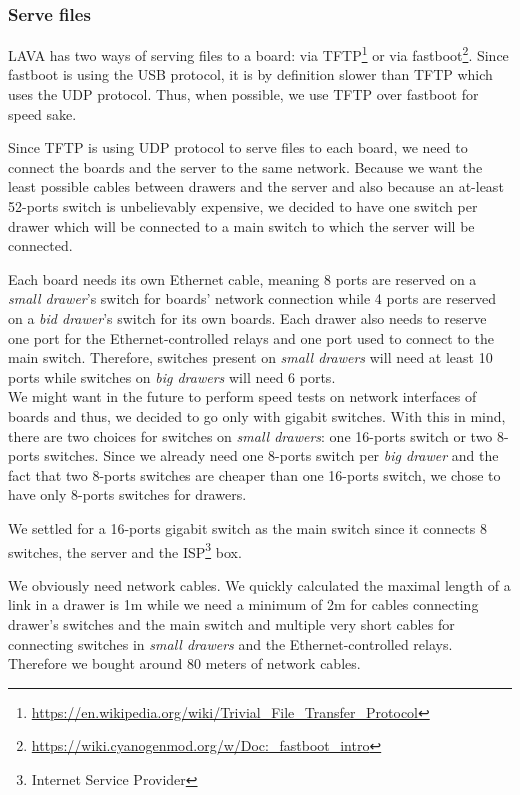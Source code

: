 \subsubsection{Serve files}

LAVA has two ways of serving files to a board: via TFTP\footnote{\url{https://en.wikipedia.org/wiki/Trivial\_File\_Transfer\_Protocol}} or via fastboot\footnote{\url{https://wiki.cyanogenmod.org/w/Doc:\_fastboot\_intro}}. Since fastboot is using the USB protocol, it is by definition slower than TFTP which uses the UDP protocol. Thus, when possible, we use TFTP over fastboot for speed sake.

Since TFTP is using UDP protocol to serve files to each board, we need to connect the boards and the server to the same network. Because we want the least possible cables between drawers and the server and also because an at-least 52-ports switch is unbelievably expensive, we decided to have one switch per drawer which will be connected to a main switch to which the server will be connected.

Each board needs its own Ethernet cable, meaning 8 ports are reserved on a \textit{small drawer}'s switch for boards' network connection while 4 ports are reserved on a \textit{bid drawer}'s switch for its own boards. Each drawer also needs to reserve one port for the Ethernet-controlled relays and one port used to connect to the main switch. Therefore, switches present on \textit{small drawers} will need at least 10 ports while switches on \textit{big drawers} will need 6 ports.\\
We might want in the future to perform speed tests on network interfaces of boards and thus, we decided to go only with gigabit switches. With this in mind, there are two choices for switches on \textit{small drawers}: one 16-ports switch or two 8-ports switches. Since we already need one 8-ports switch per \textit{big drawer} and the fact that two 8-ports switches are cheaper than one 16-ports switch, we chose to have only 8-ports switches for drawers.

We settled for a 16-ports gigabit switch as the main switch since it connects 8 switches, the server and the ISP\footnote{Internet Service Provider} box.

We obviously need network cables. We quickly calculated the maximal length of a link in a drawer is 1m while we need a minimum of 2m for cables connecting drawer's switches and the main switch and multiple very short cables for connecting switches in \textit{small drawers} and the Ethernet-controlled relays. Therefore we bought around 80 meters of network cables.


